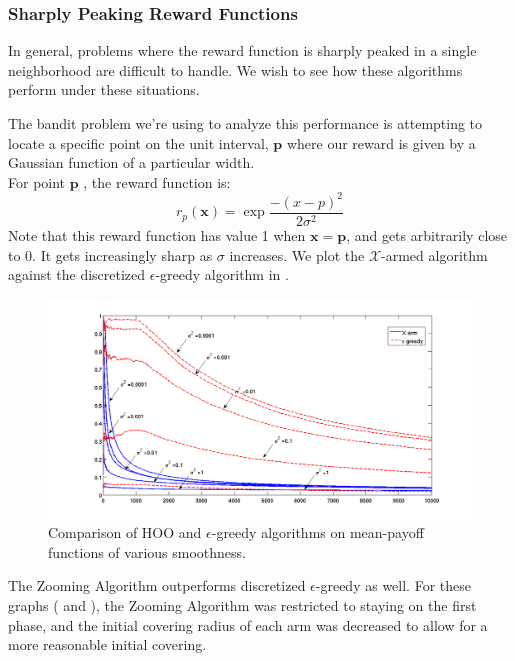 \subsubsection{Sharply Peaking Reward Functions}
In general, problems where the reward function is sharply peaked in a
single neighborhood are difficult to handle. We wish to see how these
algorithms perform under these situations.

The bandit problem we're using to analyze this performance is
attempting to locate a specific point on the unit interval,
$\mathbf{p}$ where our reward is given by a Gaussian function of a
particular width.\\ For point $\mathbf{p}$ , the reward function is:
\[
	r_p(\mathbf{x}) = \exp{\frac{-(x-p)^2}{2\sigma^2}}
\]
Note that this reward function has value 1 when $\mathbf{x}
= \mathbf{p}$, and gets arbitrarily close to 0.  It gets increasingly
sharp as $\sigma$ increases.  We plot the $\mathcal{X}$-armed
algorithm against the discretized $\epsilon$-greedy algorithm in
.

\begin{figure}[!ht]
  \begin{center}
    \includegraphics[width=\figwidth]{figures/smoothnessComparison_linear_labelled}
     \caption{Comparison of HOO and $\epsilon$-greedy algorithms on
       mean-payoff functions of various smoothness.}
     \label{fig:smoothness2}
  \end{center}
\end{figure}

The Zooming Algorithm outperforms discretized $\epsilon$-greedy as
well.  For these graphs ( and
), the Zooming Algorithm was restricted to
staying on the first phase, and the initial covering radius of each
arm was decreased to allow for a more reasonable initial covering.

